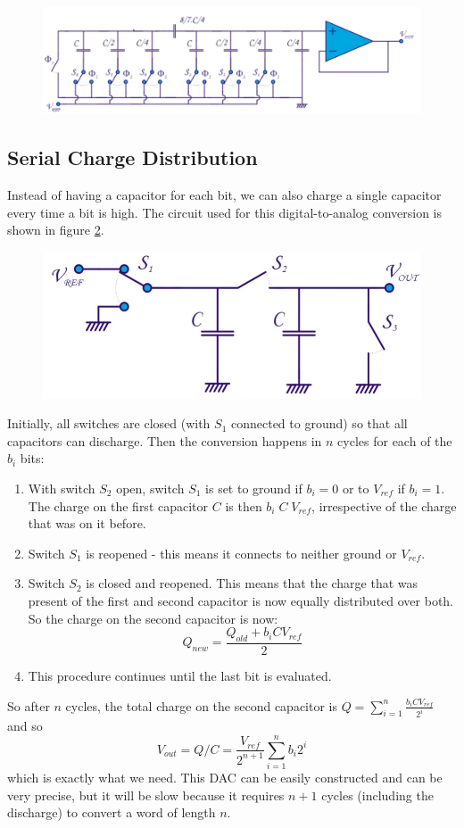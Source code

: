\begin{figure}[h!]
	\centering
	\includegraphics[width=16cm]{figures/ch18/dac8.jpg}
	\caption{}
	\label{fig:dac8}
\end{figure}

\subsection{Serial Charge Distribution}
\label{sec:serial_charge}
Instead of having a capacitor for each bit, we can also charge a single capacitor every time a bit is high. The circuit used for this digital-to-analog conversion is shown in figure \ref{fig:dac9}.\\

\begin{figure}[h!]
	\centering
	\includegraphics[width=12cm]{figures/ch18/dac9.jpg}
	\caption{}
	\label{fig:dac9}
\end{figure}

Initially, all switches are closed (with $S_1$ connected to ground) so that all capacitors can discharge. Then the conversion happens in $n$ cycles for each of the $b_i$ bits:
\begin{enumerate}
	\item With switch $S_2$ open, switch $S_1$ is set to ground if $b_i = 0$ or to $V_{ref}$ if $b_i = 1$. The charge on the first capacitor $C$ is then $b_i \; C \; V_{ref}$, irrespective of the charge that was on it before.
	\item Switch $S_1$ is reopened - this means it connects to neither ground or $V_{ref}$.
	\item Switch $S_2$ is closed and reopened. This means that the charge that was present of the first and second capacitor is now equally distributed over both. So the charge on the second capacitor is now:
	$$ Q_{new} = \frac{Q_{old} + b_i C V_{ref}}{2} $$
	\item This procedure continues until the last bit is evaluated.
\end{enumerate}
So after $n$ cycles, the total charge on the second capacitor is $Q = \sum_{i=1}^n \frac{b_i C V_{ref}}{2^i}$ and so
 $$V_{out} = Q/C =  \frac{V_{ref}}{2^{n+1}} \sum_{i=1}^{n} b_i 2^i$$
 which is exactly what we need. This DAC can be easily constructed and can be very precise, but it will be slow because it requires $n+1$ cycles (including the discharge) to convert a word of length $n$.

